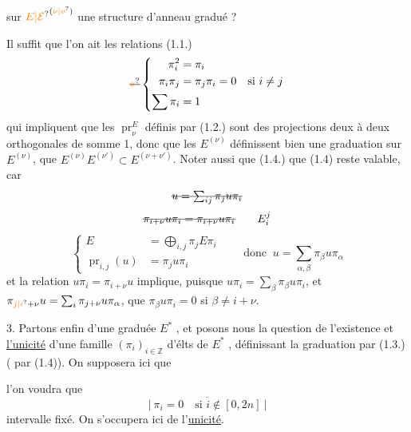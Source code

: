 sur $\unsure{E|\mathcal E}^{(\unsure{\nu|v})}$ une structure d'anneau gradué ?

Il suffit que l'on ait les relations (1.1.)
\[
 \deleted{\unsure{*}}\left\{\begin{aligned}
 \pi_i^2&=\pi_i\\
 \pi_i\pi_j&=\pi_j\pi_i=0\quad\text{si }i\ne j\\
 \sum\pi_i&=1
 \end{aligned}\right.
\]
qui impliquent que les $\operatorname{pr}_{\nu}^{E}$ définis par (1.2.) sont des projections deux à deux orthogonales de somme 1, donc que les $E^{(\nu)}$ définissent bien une graduation  sur $E^{(\nu)}$,   que $E^{(\nu)} E^{(\nu')}\subset E^{(\nu+\nu')}$. Noter aussi que (1.4.) que (1.4) reste valable, car  
\[
 \deleted{u=\sum_{ij}\pi_j u\pi_i}
\]
\[
 \deleted{\pi_{i+\nu}u\pi_i=\pi_{i+\nu}u\pi_i}\qquad E_i^j
\]
\[
 \left\{\begin{aligned}
 E&=\bigoplus_{i,j}\pi_j E\pi_i\\
 \operatorname{pr}_{i,j}(u)&=\pi_j u\pi_i
 \end{aligned}\right.\qquad\text{donc }\ u=\sum_{\alpha,\beta}\pi_\beta u\pi_\alpha
\]
et la relation $u\pi_i=\pi_{i+\nu}u$ implique, puisque $u\pi_i=\sum_{\beta}\pi_{\beta}u\pi_i$, et $\pi_{\unsure{j|i}+\nu}u=\sum_i\pi_{j+\nu}u\pi_\alpha$, que $\pi_\beta u\pi_i=0$ si $\beta\ne i+\nu$.


3.  Partons enfin d'une   graduée $E^*$ , et posons nous la question de l'existence et \uline{l'unicité} d'une famille $(\pi_i)_{i\in\mathbb Z}$ d'élts de $E^*$ , définissant la graduation par (1.3.) (  par (1.4)). On  supposera ici que

 l'on voudra que
\[
 \overline{\left|\ \pi_i=0\quad\text{si }i\notin[0,2n]\ \right|}\tag*{(3.0)}
\]
intervalle  fixé.  On s'occupera ici de l'\uline{unicité}. 

